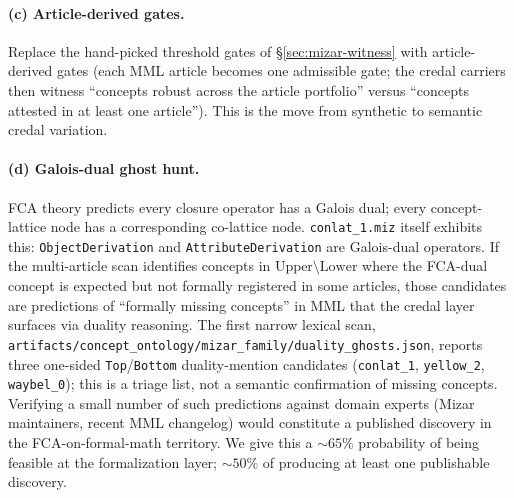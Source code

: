 \documentclass[]{article}
\newcommand{\lid}[1]{{\ttfamily\nolinkurl{#1}}}
\newcommand{\lpath}[1]{\texttt{\nolinkurl{#1}}}
\begin{document}
\paragraph{(c) Article-derived gates.} Replace the hand-picked threshold gates of
\S\ref{sec:mizar-witness} with article-derived gates (each MML article becomes one
admissible gate; the credal carriers then witness ``concepts robust across the
article portfolio'' versus ``concepts attested in at least one article''). This is
the move from synthetic to semantic credal variation.

\paragraph{(d) Galois-dual ghost hunt.} FCA theory predicts every closure operator
has a Galois dual; every concept-lattice node has a corresponding co-lattice node.
\lid{conlat\_1.miz} itself exhibits this: \lid{ObjectDerivation} and
\lid{AttributeDerivation} are Galois-dual operators. If the multi-article scan
identifies concepts in \(\mathrm{Upper}\setminus\mathrm{Lower}\) where the FCA-dual concept is
expected but not formally registered in some articles, those candidates are
predictions of ``formally missing concepts'' in MML that the credal layer surfaces
via duality reasoning. The first narrow lexical scan,
\lpath{artifacts/concept\_ontology/mizar\_family/duality\_ghosts.json}, reports
three one-sided \lid{Top}/\lid{Bottom} duality-mention candidates
(\lid{conlat\_1}, \lid{yellow\_2}, \lid{waybel\_0}); this is a triage list, not a
semantic confirmation of missing concepts. Verifying a small number of such
predictions against domain experts (Mizar maintainers, recent MML changelog) would
constitute a published discovery in the FCA-on-formal-math territory. We give this
a ${\sim}65\%$
probability of being feasible at the formalization layer; ${\sim}50\%$ of
producing at least one publishable discovery.
\end{document}
